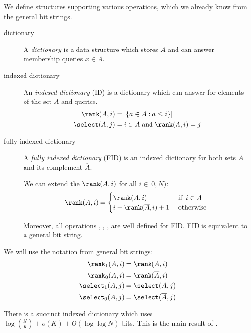 We define structures supporting various operations, which we already know from the general bit strings.
\begin{description}
	\item[dictionary]
	A \emph{dictionary} is a data structure which stores $A$ and can answer membership queries $x \in A$.
	
	\item[indexed dictionary] 
	An \emph{indexed dictionary} (ID) is a dictionary which can answer \rank{} for elements of the set $A$ and \select{} queries.
	\begin{align*}
		\rank(A, i) &= |\{ a \in A : a \le i \}| \\
		\select(A, j) &= i \in A \booland \rank(A, i) = j \\
	\end{align*}
	
	\item[fully indexed dictionary]
	A \emph{fully indexed dictionary} (FID) is an indexed dictionary for both sets $A$ and its complement $\overline{A}$.
	
	We can extend the $\rank(A, i)$ for all $i \in [0, N)$:
	$$ \rank(A, i) = \begin{cases}
		\rank(A, i) & \textif i \in A \\
		i - \rank(\overline{A}, i) + 1 & \textotherwise
	\end{cases}$$
	
	Moreover, all operations \pred{}, \succ{}, \prev{}, \nextt{} are well defined for FID.
	FID is equivalent to a general bit string.
\end{description}

We will use the notation from general bit strings:
\begin{align*}
	\rank_1(A, i) &= \rank(A, i) \\
	\rank_0(A, i) &= \rank(\overline{A}, i) \\
	\select_1(A, j) &= \select(A, j) \\
	\select_0(A, j) &= \select(\overline{A}, j) \\
\end{align*}

\bigbreak

\begin{lemma}\label{l:succint-indexed-dictionary}
	There is a succinct indexed dictionary which uses $\log {N \choose K} + o(K) + O(\log \log N)$ bits.
	This is the main result of \cite[Theorem~4.1]{raman2007succinct}.
\end{lemma}

